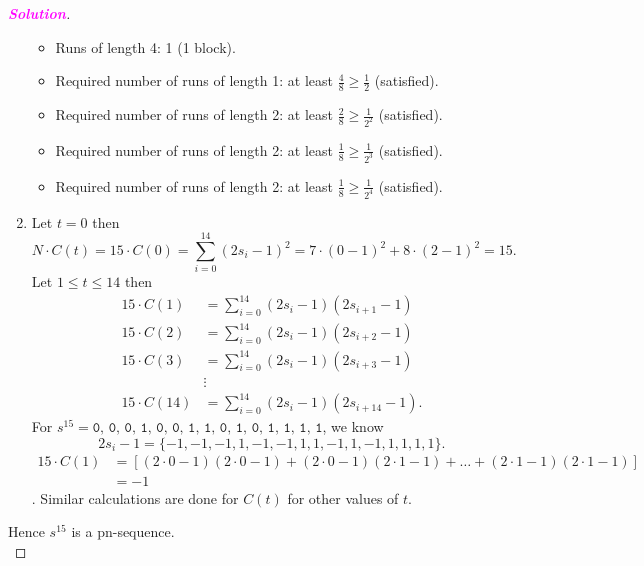 \documentclass[12pt,openany]{book}
\theoremstyle{definition}
\newcommand{\sol}{\textcolor{magenta}{\bf Solution}}
\begin{document}
\begin{proof}[\sol]
\begin{enumerate}[\textbf{R}1]
\begin{itemize}
			\item Runs of length 4: 1 (1 block).
			\item Required number of runs of length 1: at least $\frac{4}{8} \geq\frac{1}{2}$ (satisfied).
			\item Required number of runs of length 2: at least $\frac{2}{8} \geq\frac{1}{2^2}$ (satisfied).
			\item Required number of runs of length 2: at least $\frac{1}{8} \geq\frac{1}{2^3}$ (satisfied).
			\item Required number of runs of length 2: at least $\frac{1}{8} \geq\frac{1}{2^4}$ (satisfied).
		\end{itemize}
		\item Let $t=0$ then \[
		N\cdot C(t)=15\cdot C(0)=\sum_{i=0}^{14}(2s_i-1)^2=7\cdot(0-1)^2 + 8\cdot (2-1)^2= 15.
		\] Let $1\leq t\leq 14$ then 
		\begin{align*}
			15 \cdot C(1)&=\sum_{i=0}^{14}(2s_i-1)(2s_{i+1}-1)\\
			15 \cdot C(2)&=\sum_{i=0}^{14}(2s_i-1)(2s_{i+2}-1)\\
			15 \cdot C(3)&=\sum_{i=0}^{14}(2s_i-1)(2s_{i+3}-1)\\
			&\vdots\\
			15 \cdot C(14)&=\sum_{i=0}^{14}(2s_i-1)(2s_{i+14}-1).
		\end{align*}
		For $
		s^{15} = \texttt{0, 0, 0, 1, 0, 0, 1, 1, 0, 1, 0, 1, 1, 1, 1}
		$, we know
		\[
		2s_i-1= \{-1, -1, -1, 1, -1, -1, 1, 1, -1, 1, -1, 1, 1, 1, 1\}.
		\]
		\begin{align*}
			15\cdot C(1) &= [ (2 \cdot 0 - 1)(2 \cdot 0 - 1) + (2 \cdot 0 - 1)(2 \cdot 1 - 1) + \ldots + (2 \cdot 1 - 1)(2 \cdot 1 - 1) ] \\
			&= -1
		\end{align*}.
		Similar calculations are done for $C(t)$ for other values of $t$.
	\end{enumerate} 
	Hence $s^{15}$ is a pn-sequence.\\
\end{proof}

\newpage
\end{document}
